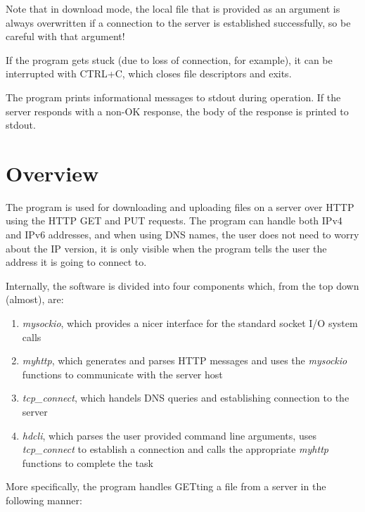 \documentclass[a4paper,12pt]{article}
\begin{document}
Note that in download mode, the local file that is provided as an argument is always overwritten if a connection to the server is established successfully, so be careful with that argument!

If the program gets stuck (due to loss of connection, for example), it can be interrupted with CTRL+C, which closes file descriptors and exits.

The program prints informational messages to stdout during operation. If the server responds with a non-OK response, the body of the response is printed to stdout.

\section{Overview}

The program is used for downloading and uploading files on a server over HTTP using the HTTP GET and PUT requests. The program can handle both IPv4 and IPv6 addresses, and when using DNS names, the user does not need to worry about the IP version, it is only visible when the program tells the user the address it is going to connect to.

Internally, the software is divided into four components which, from the top down (almost), are:

\begin{enumerate}
\item \emph{mysockio}, which provides a nicer interface for the standard socket I/O system calls
\item \emph{myhttp}, which generates and parses HTTP messages and uses the \emph{mysockio} functions to communicate with the server host
\item \emph{tcp\_connect}, which handels DNS queries and establishing connection to the server
\item \emph{hdcli}, which parses the user provided command line arguments, uses \emph{tcp\_connect} to establish a connection and calls the appropriate \emph{myhttp} functions to complete the task
\end{enumerate}

More specifically, the program handles GETting a file from a server in the following manner:

\sloppy
\end{document}
